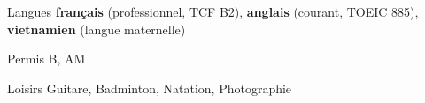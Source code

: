

\begin{cvskills}
    

 \cvskill
    {Langues} %
    {\textbf{français} (professionnel, TCF B2), \textbf{anglais} (courant, TOEIC 885), \textbf{vietnamien} (langue maternelle)} %

  \cvskill
    {Permis} %
    {B, AM} %
    
  \cvskill
    {Loisirs} %
    {Guitare, Badminton, Natation, Photographie} %
    
\end{cvskills}

